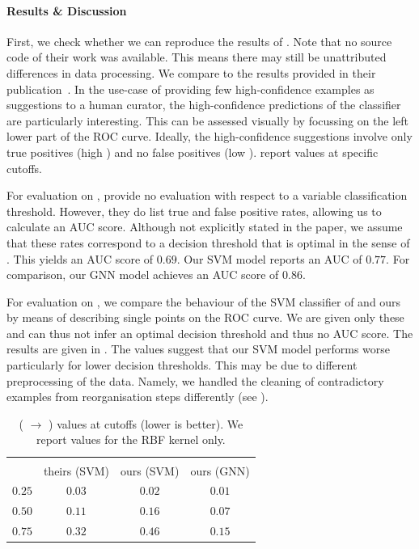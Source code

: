 \documentclass[
	fontsize=10pt, %
	twoside=false, %
	secnumdepth=1, %
  toc=indentunnumbered %
]{kaobook}
\begin{document}
\paragraph{Results \& Discussion}

First, we check whether we can reproduce the results of \nielsen{}. Note that no
source code of their work was available. This means there may still be
unattributed differences in data processing. We compare to the results
provided in their publication~\cite{nielsen_MachineLearningSupport_2019}. In the
use-case of providing few high-confidence examples as suggestions to a human
curator, the high-confidence predictions of the classifier are particularly
interesting. This can be assessed visually by focussing on the left lower part
of the ROC curve.
Ideally, the high-confidence suggestions involve only true
positives (high \TPR{}) and no false positives (low \FPR{}).
\nielsen{} report \FPR{} values at specific \TPR{} cutoffs.

For evaluation on \PDMap{}, \nielsen{} provide no evaluation with respect to a
variable classification threshold. However, they do list true and false positive
rates, allowing us to calculate an AUC score. Although not explicitly stated in
the paper, we assume that these rates correspond to a decision threshold  
 that is optimal in the sense of . This yields an
 AUC score of $0.69$. Our SVM model reports an AUC of $0.77$. For comparison,
 our GNN model achieves an AUC score of $0.86$.

 For evaluation on \ReconMap{}, we compare the behaviour of the SVM classifier
 of \nielsen{} and ours by means of describing single points on the ROC curve.
 We are given only these and can thus not infer an optimal decision threshold
 and thus no AUC score. The results are given in
 . The values suggest that our SVM model
 performs worse particularly for lower decision thresholds.
This may be due to different preprocessing of the data. Namely, we handled the
cleaning of contradictory examples from reorganisation steps differently (see ).


\begin{table}[h]
  \begin{tabular}{c | c | c c}
    \TPR{} & \multicolumn{3}{c}{\FPR{}} \\
    ~ & theirs (SVM) & ours (SVM) & ours (GNN) \\
    \hline
    $0.25$ & $0.03$ & $0.02$ & $0.01$  \\
    $0.50$ & $0.11$ & $0.16$ & $0.07$  \\
    $0.75$ & $0.32$ & $0.46$ & $0.15$
  \end{tabular}
  \caption{ (\ADMap{} $\rightarrow$ \ReconMap) \FPR{} values at \TPR{} cutoffs
    (lower is better). We report values for the RBF kernel only. }
  \label{tab:svm-repro-theirs-vs-ours}
\end{table}
\end{document}
